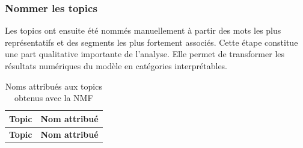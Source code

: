 \subsubsection{Nommer les topics}

Les topics ont ensuite été nommés manuellement à partir des mots les plus représentatifs et des segments les plus fortement associés. Cette étape constitue une part qualitative importante de l'analyse. Elle permet de transformer les résultats numériques du modèle en catégories interprétables.

\begin{longtable}{p{2cm}p{11cm}}
\caption{Noms attribués aux topics obtenus avec la NMF} \\
\toprule
\textbf{Topic} & \textbf{Nom attribué} \\
\midrule
\endfirsthead

\toprule
\textbf{Topic} & \textbf{Nom attribué} \\
\midrule
\endhead


\end{longtable}
